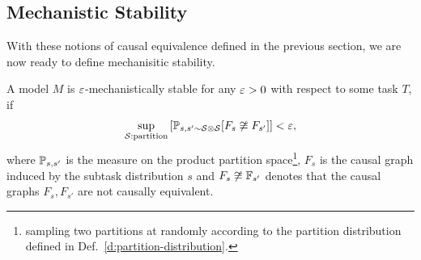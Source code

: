 \subsection{Mechanistic Stability}\label{s:mech-stab}
With these notions of causal equivalence defined in the previous section,
we are now ready to define mechanisitic stability.

\begin{defn}
A model $M$ is $\eps$-mechanistically stable for any $\eps > 0$ with respect
to some task $T$, if 
\begin{equation}
\sup_{\cS:\text{partition}}
\left[\P_{s, s' \sim \cS \otimes \cS}[F_s \not\cong F_{s'}]\right] < \eps,
\end{equation}
where $\P_{s,s'}$ is the measure on the product partition space\footnote{
sampling two partitions at randomly according to the partition distribution
defined in Def.~\ref{d:partition-distribution}.
}, $F_s$ is the causal graph induced by the subtask distribution $s$ and
$F_s \not \cong \F_{s'}$ denotes that the causal graphs $F_s, F_{s'}$ are not
causally equivalent.
\end{defn}


